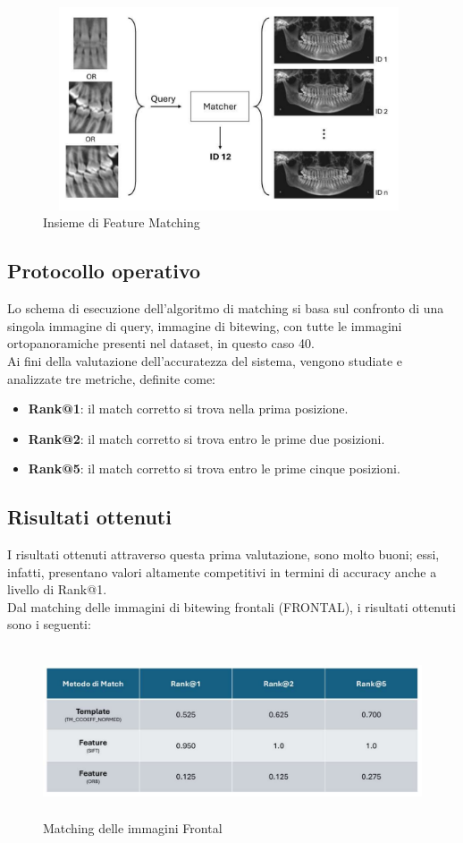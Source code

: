 \documentclass[12pt,a4paper,openright,twoside]{book}
\begin{document}
\begin{figure}[H]
	\centering
	\includegraphics[height=6cm,width=11cm]{figures/matchprof.pdf}
    	\caption{Insieme di Feature Matching}
	\label{fig:featurematching}
\end{figure}


\subsection{Protocollo operativo}
Lo schema di esecuzione dell'algoritmo di matching si basa sul confronto di una singola immagine di query, immagine di bitewing, con tutte le immagini ortopanoramiche presenti nel dataset, in questo caso 40.\\
Ai fini della valutazione dell'accuratezza del sistema, vengono studiate e analizzate tre metriche, definite come:
\begin{itemize}
\item \textbf{Rank@1}: il match corretto si trova nella prima posizione.
\item \textbf{Rank@2}: il match corretto si trova entro le prime due posizioni.
\item \textbf{Rank@5}: il match corretto si trova entro le prime cinque posizioni.
\end{itemize}

\subsection{Risultati ottenuti}
I risultati ottenuti attraverso questa prima valutazione, sono molto buoni; essi, infatti, presentano valori altamente competitivi in termini di accuracy anche a livello di Rank@1.\\
Dal matching delle immagini di bitewing frontali (FRONTAL), i risultati ottenuti sono i seguenti:

\begin{figure}[H]
	\centering
	\includegraphics[height=5cm,width=15cm]{figures/frontalprof.pdf}
    	\caption{Matching delle immagini Frontal}
	\label{fig:frontalprof}
\end{figure}
\end{document}
